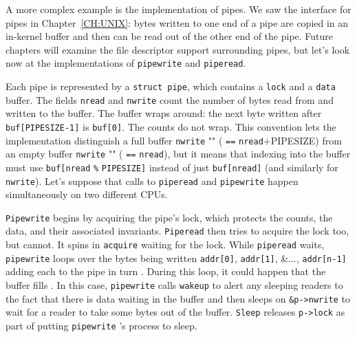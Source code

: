 A more complex example is the implementation of pipes.
We saw the interface for pipes in Chapter~\ref{CH:UNIX}:
bytes written to one end of a pipe are copied
in an in-kernel buffer and then can be read out
of the other end of the pipe.
Future chapters will examine the file descriptor support
surrounding pipes, but let's look now at the
implementations of 
\lstinline{pipewrite}
and
\lstinline{piperead}.

Each pipe
is represented by a 
\lstinline{struct pipe},
which contains
a 
\lstinline{lock}
and a 
\lstinline{data}
buffer.
The fields
\lstinline{nread}
and
\lstinline{nwrite}
count the number of bytes read from
and written to the buffer.
The buffer wraps around:
the next byte written after
\lstinline{buf[PIPESIZE-1]}
is 
\lstinline{buf[0]}.
The counts do not wrap.
This convention lets the implementation
distinguish a full buffer 
\lstinline{nwrite} "" (
\lstinline{==}
\lstinline{nread}+PIPESIZE)
from an empty buffer
\lstinline{nwrite} "" (
\lstinline{==}
\lstinline{nread}),
but it means that indexing into the buffer
must use
\lstinline{buf[nread}
\lstinline{%}
\lstinline{PIPESIZE]}
instead of just
\lstinline{buf[nread]} 
(and similarly for
\lstinline{nwrite}).
Let's suppose that calls to
\lstinline{piperead}
and
\lstinline{pipewrite}
happen simultaneously on two different CPUs.

\lstinline{Pipewrite}
begins by acquiring the pipe's lock, which
protects the counts, the data, and their
associated invariants.
\lstinline{Piperead}
then tries to acquire the lock too, but cannot.
It spins in
\lstinline{acquire}
waiting for the lock.
While
\lstinline{piperead}
waits,
\lstinline{pipewrite}
loops over the bytes being written
\lstinline{addr[0]},
\lstinline{addr[1]},
\&...,
\lstinline{addr[n-1]}
adding each to the pipe in turn
.
During this loop, it could happen that
the buffer fills
.
In this case, 
\lstinline{pipewrite}
calls
\lstinline{wakeup}
to alert any sleeping readers to the fact
that there is data waiting in the buffer
and then sleeps on
\lstinline{&p->nwrite}
to wait for a reader to take some bytes
out of the buffer.
\lstinline{Sleep}
releases 
\lstinline{p->lock}
as part of putting
\lstinline{pipewrite} 's
process to sleep.

